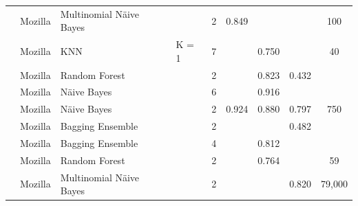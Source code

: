 \documentclass[a4paper]{article}
\begin{document}
\begin{table}[htp]
\begin{tabular}{@{}p{}p{}p{}p{}ccccc@{}}
        \cite{Yang:2012}                    &  Mozilla                          &  Multinomial Näive Bayes                        &  & 2 & 0.849                               &                   &                    & 100                                          \\ 
        \cmidrule{1-9}    
        \cite{Yang:2014b}                   &  Mozilla                          &  KNN                        & K = 1 & 7 &                                     &  0.750           &                    & 40                                          \\ 
        \cmidrule{1-9}
        \cite{Valdivia:2014}                &  Mozilla                          &  Random Forest              &  & 2 &                                     &  0.823            &  0.432             &                                           \\ 
        \cmidrule{1-9}
        \cite{Meera:2014}                   &  Mozilla                          &  Näive Bayes                         &  & 6 &                                     &  0.916            &                    &                                           \\ 
        \cmidrule{1-9}
        \cite{Roy:2014}                     &  Mozilla                          &  Näive Bayes                         &  & 2 & 0.924                               &  0.880                 &  0.797                & 750                                          \\ 
        \cmidrule{1-9}
        \cite{Xia:2015}                     &  Mozilla                          &  Bagging Ensemble           &  & 2 &                                     &                   &  0.482             &                                           \\ 
        \cmidrule{1-9}
        \cite{Pushpalathas:2016}            &  Mozilla                          &  Bagging Ensemble           &  & 4 &                                     &  0.812            &                    &                                           \\ 
        \cmidrule{1-9}
        \cite{Otoom:2016}                   &  Mozilla                  &  Random Forest              &  & 2 &                                     &  0.764            &                    & 59                                          \\ 
        \cmidrule{1-9}
        \cite{Jin:2016a}                    &  Mozilla                               &  Multinomial Näive Bayes                        &  & 2 &                                     &                   &    0.820                &  79,000                                         \\ 

\end{tabular}
\end{table}
\end{document}
